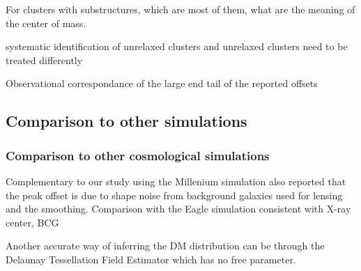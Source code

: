For clusters with substructures, which are most of them, what are the meaning
of the center of mass. 


systematic identification of unrelaxed clusters and  
unrelaxed clusters need to be treated differently


Observational correspondance of the large end tail of the reported offsets 


\subsection{Comparison to other simulations}
\subsubsection{Comparison to other cosmological simulations}
\cite{Johnston2007a}

 

Complementary to our study 
using the Millenium simulation \cite{Dietrich2012} also reported that 
 the peak offset is due to shape noise from 
background galaxies used for lensing and the smoothing.  
\cite{Hilbert2010}
Comparison with the Eagle simulation   
consistent with \cite{Cui2015} X-ray center, BCG

Another accurate way of inferring the DM distribution can be through 
the Delaunay Tessellation Field Estimator which has no free parameter.



 
% 
% 
